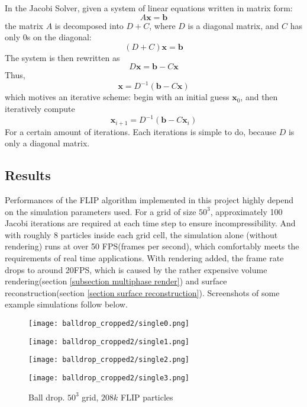 In the Jacobi Solver, given a system of linear equations written in matrix form:
$$
A\textbf{x}=\textbf{b}
$$
the matrix $A$ is decomposed into $D+C$, where $D$ is a diagonal matrix, and $C$ has only $0$s on the diagonal:
$$
(D+C)\textbf{x}=\textbf{b}
$$
The system is then rewritten as 
$$
D\textbf{x}=\textbf{b} - C\textbf{x}
$$
Thus,
$$
\textbf{x}=D^{-1}(\textbf{b} - C\textbf{x})
$$
which motives an iterative scheme: begin with an initial guess $\textbf{x}_0$, and then iteratively compute
$$
\textbf{x}_{i+1} = D^{-1}(\textbf{b} - C\textbf{x}_{i})
$$
For a certain amount of iterations. Each iterations is simple to do, because $D$ is only a diagonal matrix. 


\subsection{Results}
Performances of the FLIP algorithm implemented in this project highly depend on the simulation parameters used. For a grid of size $50^3$, approximately 100 Jacobi iterations are required at each time step to ensure incompressibility. And with roughly 8 particles inside each grid cell, the simulation alone (without rendering) runs at over 50 FPS(frames per second), which comfortably meets the requirements of real time applications. With rendering added, the frame rate drops to around 20FPS, which is caused by the rather expensive volume rendering(section \ref{subsection multiphase render}) and surface reconstruction(section \ref{section surface reconstruction}). Screenshots of some example simulations follow below.
\begin{figure}[H]
    \centering
    
    \begin{minipage}[t]{.42\linewidth}
        \centering
        \vspace{0pt}
        \texttt{[image: balldrop\_cropped2/single0.png]}
    \end{minipage}
    \begin{minipage}[t]{.42\linewidth}
        \centering
        \vspace{0pt}
        \texttt{[image: balldrop\_cropped2/single1.png]}
    \end{minipage}

    \vspace{0.5cm}

    \begin{minipage}[t]{.42\linewidth}
        \centering
        \vspace{0pt}
        \texttt{[image: balldrop\_cropped2/single2.png]}
    \end{minipage}
    \begin{minipage}[t]{.42\linewidth}
        \centering
        \vspace{0pt}
        \texttt{[image: balldrop\_cropped2/single3.png]}
    \end{minipage}

    \caption{Ball drop. $50^3$ grid, $208k$ FLIP particles}
    \label{figure ball drop single}
\end{figure}


